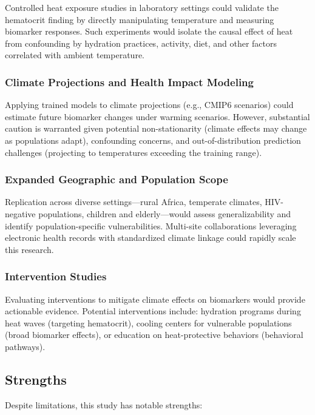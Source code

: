 Controlled heat exposure studies in laboratory settings could validate the hematocrit finding by directly manipulating temperature and measuring biomarker responses. Such experiments would isolate the causal effect of heat from confounding by hydration practices, activity, diet, and other factors correlated with ambient temperature.

\subsubsection{Climate Projections and Health Impact Modeling}

Applying trained models to climate projections (e.g., CMIP6 scenarios) could estimate future biomarker changes under warming scenarios. However, substantial caution is warranted given potential non-stationarity (climate effects may change as populations adapt), confounding concerns, and out-of-distribution prediction challenges (projecting to temperatures exceeding the training range).

\subsubsection{Expanded Geographic and Population Scope}

Replication across diverse settings---rural Africa, temperate climates, HIV-negative populations, children and elderly---would assess generalizability and identify population-specific vulnerabilities. Multi-site collaborations leveraging electronic health records with standardized climate linkage could rapidly scale this research.

\subsubsection{Intervention Studies}

Evaluating interventions to mitigate climate effects on biomarkers would provide actionable evidence. Potential interventions include: hydration programs during heat waves (targeting hematocrit), cooling centers for vulnerable populations (broad biomarker effects), or education on heat-protective behaviors (behavioral pathways).

\subsection{Strengths}

Despite limitations, this study has notable strengths:

